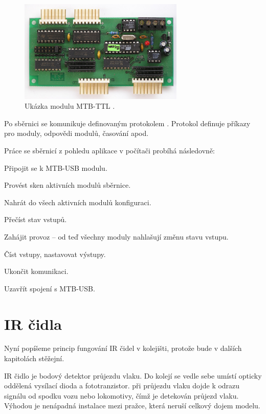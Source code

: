 \begin{figure}[ht]
\includegraphics[width=0.7\textwidth]{data/mtbttl_foto.jpg}
\caption{Ukázka modulu MTB-TTL \cite{mtb:web}.}
\label{fig:mtbttl}
\end{figure}

Po sběrnici se komunikuje definovaným protokolem \cite{mtbbus-proto}. Protokol
definuje příkazy pro moduly, odpovědi modulů, časování apod.

Práce se sběrnicí z pohledu aplikace v počítači probíhá následovně:

\begin{compactenum}
\item Připojit se k MTB-USB modulu.
\item Provést sken aktivních modulů sběrnice.
\item Nahrát do všech aktivních modulů konfiguraci.
\item Přečíst stav vstupů.
\item Zahájit provoz – od teď všechny moduly nahlašují změnu stavu vstupu.
\item Číst vstupy, nastavovat výstupy.
\item Ukončit komunikaci.
\item Uzavřít spojení s MTB-USB.
\end{compactenum}

\section{IR čidla} \label{sec:uni_ir}

Nyní popíšeme princip fungování IR čidel v kolejišti, protože bude v dalších
kapitolách stěžejní.

IR čidlo je bodový detektor průjezdu vlaku. Do kolejí se vedle sebe umístí
opticky oddělená vysílací dioda a fototranzistor. při průjezdu vlaku dojde k
odrazu signálu od spodku vozu nebo lokomotivy, čímž je detekován průjezd vlaku.
Výhodou je nenápadná instalace mezi pražce, která neruší celkový dojem modelu.

